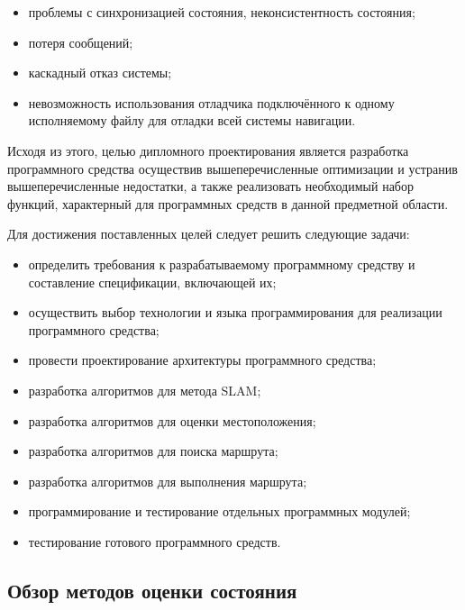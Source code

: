 \begin{itemize}
	\item проблемы с синхронизацией состояния, неконсистентность состояния;
	\item потеря сообщений;
	\item каскадный отказ системы;
	\item невозможность использования отладчика подключённого к одному
		исполняемому файлу для отладки всей системы навигации.
\end{itemize}

Исходя из этого, целью дипломного проектирования является разработка
программного средства осуществив вышеперечисленные оптимизации и устранив
вышеперечисленные недостатки, а также
реализовать необходимый набор функций, характерный для программных средств в
данной предметной области.

Для достижения поставленных целей следует решить следующие задачи: 
\begin{itemize}
	\item определить требования  к  разрабатываемому  программному  средству  и 
	составление спецификации, включающей их; 
	\item осуществить выбор  технологии  и  языка  программирования  для
		реализации программного средства; 
	\item провести проектирование архитектуры программного средства; 
	\item разработка алгоритмов для метода SLAM; 
	\item разработка алгоритмов для оценки местоположения; 
	\item разработка алгоритмов для поиска маршрута; 
	\item разработка алгоритмов для выполнения маршрута; 
	\item программирование и тестирование отдельных программных модулей; 
	\item тестирование готового программного средств.
\end{itemize}


\subsection{Обзор методов оценки состояния}

